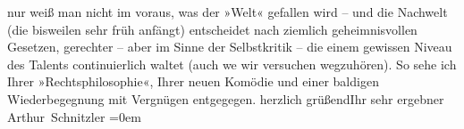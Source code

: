 \begin{ledgroupsized}[t]{13cm}
                    nur weiß man nicht im voraus, was der »Welt« gefallen wird – und die Nachwelt
                    (die bisweilen sehr früh anfängt) ent{\pb}scheidet nach ziemlich
                    geheimnisvollen Gesetzen, gerechter – aber im Sinne der Selbstkritik – die einem
                    gewissen Niveau des Talents continuierlich waltet (auch we{\geminationn} wir versuchen wegzuhören).\pend
           \pstart
           So sehe ich Ihrer »Rechtsphilosophie«, Ihrer
                    neuen Komödie und einer baldigen Wiederbegegnung mit Vergnügen entgegegen.\pend
           \pstart
           herzlich grüßend\hspace*{1.5em}Ihr sehr ergebner{\\[\baselineskip]}\spacefill\mbox{Arthur Schnitzler}\pend
           \leftskip=0em{}
         
         \endnumbering{}\end{ledgroupsized}  \newcommand{\dateiname}{L02216}\newcommand{\titel}{Arthur Schnitzler an Robert Adam, 20. 7. 1915}\newcommand{\editorInnen}{Martin Anton Müller und Gerd-Hermann Susen}
      